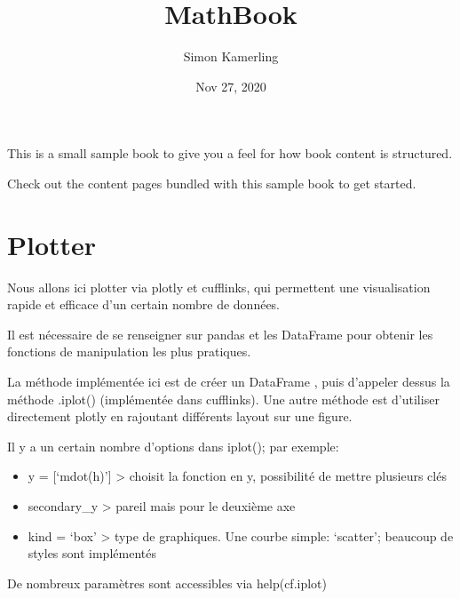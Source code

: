 \documentclass[letterpaper,10pt,english]{sphinxmanual}
\title{MathBook}
\date{Nov 27, 2020}
\author{Simon Kamerling}
\begin{document}
\pagestyle{empty}
\sphinxmaketitle
\pagestyle{plain}
\sphinxtableofcontents
\pagestyle{normal}
\label{\detokenize{intro::doc}}


This is a small sample book to give you a feel for how book content is
structured.

Check out the content pages bundled with this sample book to get started.


\chapter{Plotter}
\label{\detokenize{Part1/Plot:plotter}}\label{\detokenize{Part1/Plot::doc}}
Nous allons ici plotter via plotly et cufflinks, qui permettent une visualisation rapide et efficace d’un certain nombre de données.

Il est nécessaire de se renseigner sur pandas et les DataFrame pour obtenir les fonctions de manipulation les plus pratiques.

La méthode implémentée ici est de créer un DataFrame , puis d’appeler dessus la méthode .iplot() (implémentée dans cufflinks). Une autre méthode est d’utiliser directement plotly en rajoutant différents layout sur une figure.

Il y a un certain nombre d’options dans iplot(); par exemple:
\begin{itemize}
\item {} 
y = {[}‘mdot(h)’{]} \sphinxhyphen{}\textgreater{} choisit la fonction en y, possibilité de mettre plusieurs clés

\item {} 
secondary\_y \sphinxhyphen{}\textgreater{} pareil mais pour le deuxième axe

\item {} 
kind = ‘box’ \sphinxhyphen{}\textgreater{} type de graphiques. Une courbe simple: ‘scatter’; beaucoup de styles sont implémentés

\end{itemize}

De nombreux paramètres sont accessibles via help(cf.iplot)
\end{document}
